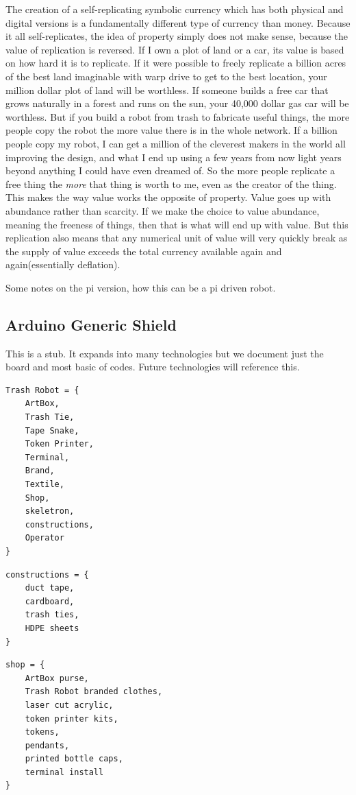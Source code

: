 The creation of a self-replicating symbolic currency which has both physical and digital versions is a fundamentally different type of currency than money.  Because it all self-replicates, the idea of property simply does not make sense, because the value of replication is reversed.  If I own a plot of land or a car, its value is based on how hard it is to replicate.  If it were possible to freely replicate a billion acres of the best land imaginable with warp drive to get to the best location, your million dollar plot of land will be worthless.  If someone builds a free car that grows naturally in a forest and runs on the sun, your 40,000 dollar gas car will be worthless.  But if you build a robot from trash to fabricate useful things, the more people copy the robot the more value there is in the whole network. If a billion people copy my robot, I can get a million of the cleverest makers in the world all improving the design, and what I end up using a few years from now light years beyond anything I could have even dreamed of.  So the more people replicate a free thing the \emph{more} that thing is worth to me, even as the creator of the thing.  This makes the way value works the opposite of property.  Value goes up with abundance rather than scarcity.  If we make the choice to value abundance, meaning the freeness of things, then that is what will end up with value.  But this replication also means that any numerical unit of value will very quickly break as the supply of value exceeds the total currency available again and again(essentially deflation).  

Some notes on the pi version, how this can be a pi driven robot.



\subsection{Arduino Generic Shield}

This is a stub.  It expands into many technologies but we document just the board and most basic of codes.  Future technologies will reference this.

\begin{verbatim}
Trash Robot = {
    ArtBox,
    Trash Tie,
    Tape Snake,
    Token Printer,
    Terminal,
    Brand,
    Textile,
    Shop,
    skeletron,
    constructions,
    Operator
}
\end{verbatim}
    
\begin{verbatim}
constructions = {
    duct tape, 
    cardboard, 
    trash ties, 
    HDPE sheets
}
\end{verbatim}
\begin{verbatim}
shop = {
    ArtBox purse, 
    Trash Robot branded clothes, 
    laser cut acrylic, 
    token printer kits,
    tokens,
    pendants,
    printed bottle caps,
    terminal install
}
\end{verbatim}

